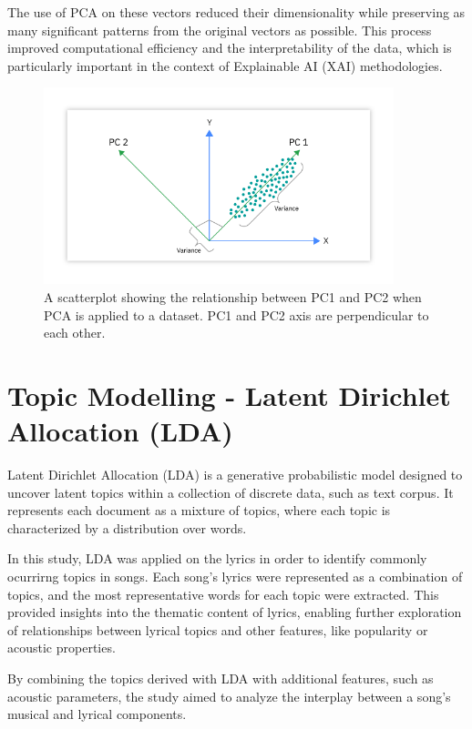 The use of PCA on these vectors reduced their dimensionality while preserving
as many significant patterns from the original vectors as possible. This
process improved computational efficiency and the interpretability of the data,
which is particularly important in the context of Explainable AI (XAI)
methodologies.

\begin{center}
\begin{figure}[H]
  \centering
  \includegraphics[width=4in]{img/pca.png}
  \caption{A scatterplot showing the relationship between PC1 and PC2 when PCA
  is applied to a dataset. PC1 and PC2 axis are perpendicular to each other.\cite{pca}}
  \label{Figure:fig_beh}
\end{figure}
\end{center}


\section{Topic Modelling - Latent Dirichlet Allocation (LDA)}
\label{sec:topicmodelling}

Latent Dirichlet Allocation (LDA)\cite{lda} is a generative probabilistic model
designed to uncover latent topics within a collection of discrete data, such as
text corpus.  It represents each document as a mixture of topics, where each
topic is characterized by a distribution over words. 

In this study, LDA was applied on the lyrics in order to identify commonly
ocurrirng topics in songs. Each song's lyrics were represented as a combination
of topics, and the most representative words for each topic were extracted.
This provided insights into the thematic content of lyrics, enabling further
exploration of relationships between lyrical topics and other features, like
popularity or acoustic properties.

By combining the topics derived with LDA with additional features, such as
acoustic parameters, the study aimed to analyze the interplay between a song's
musical and lyrical components.


